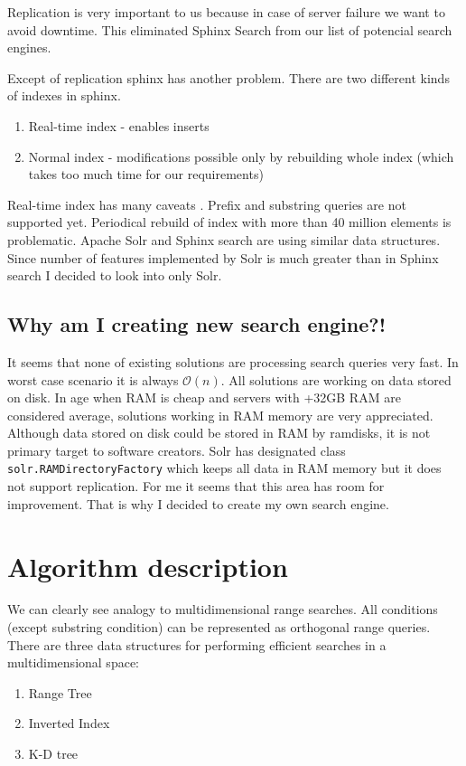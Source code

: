 \documentclass[10pt,a4paper]{article}
\newcommand{\Oh}{\mathcal{O}}
\begin{document}
Replication is very important to us because in case of server failure we want to avoid downtime. This eliminated Sphinx Search from our list of potencial search engines. 

Except of replication sphinx has another problem. There are two different kinds of indexes in sphinx.
\begin{enumerate}
\item Real-time index - enables inserts
\item Normal index - modifications possible only by rebuilding whole index (which takes too much time for our requirements)
\end{enumerate}

Real-time index has many caveats \cite{SPHINXCAV}. Prefix and substring queries are not supported yet. Periodical rebuild of index with more than 40 million elements is problematic. Apache Solr and Sphinx search are using similar data structures. Since number of features implemented by Solr is much greater than in Sphinx search I decided to look into only Solr. 

\subsection{Why am I creating new search engine?!}
It seems that none of existing solutions are processing search queries very fast. In worst case scenario it is always $\Oh(n)$. All solutions are working on data stored on disk. In age when RAM is cheap and servers with +32GB RAM are considered average, solutions working in RAM memory are very appreciated. Although data stored on disk could be stored in RAM by ramdisks, it is not primary target to software creators. Solr has designated class \verb|solr.RAMDirectoryFactory| which keeps all data in RAM memory but it does not support replication. For me it seems that this area has room for improvement. That is why I decided to create my own search engine.  

\section{Algorithm description}
We can clearly see analogy to multidimensional range searches. All conditions (except substring condition) can be represented as orthogonal range queries. There are three data structures for performing efficient searches in a multidimensional space:

\begin{enumerate}
\item Range Tree \cite{CGAAA}
\item Inverted Index
\item K-D tree \cite{CGAAA}
\end{enumerate}
\end{document}
